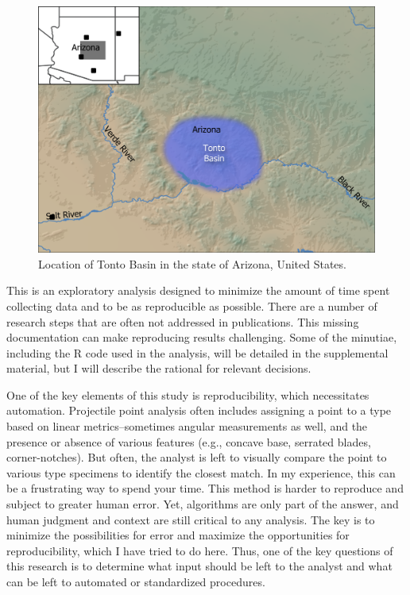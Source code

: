 \documentclass{article}
\begin{document}
\begin{figure}
\includegraphics[width=1\linewidth]{figures/Tonto Basin} \caption{Location of Tonto Basin in the state of Arizona, United States.}\label{fig:TontoBasinMap}
\end{figure}

This is an exploratory analysis designed to minimize the amount of time
spent collecting data and to be as reproducible as possible. There are a
number of research steps that are often not addressed in publications.
This missing documentation can make reproducing results challenging.
Some of the minutiae, including the R code used in the analysis, will be
detailed in the supplemental material, but I will describe the rational
for relevant decisions.

One of the key elements of this study is reproducibility, which
necessitates automation. Projectile point analysis often includes
assigning a point to a type based on linear metrics--sometimes angular
measurements as well, and the presence or absence of various features
(e.g., concave base, serrated blades, corner-notches). But often, the
analyst is left to visually compare the point to various type specimens
to identify the closest match. In my experience, this can be a
frustrating way to spend your time. This method is harder to reproduce
and subject to greater human error. Yet, algorithms are only part of the
answer, and human judgment and context are still critical to any
analysis. The key is to minimize the possibilities for error and
maximize the opportunities for reproducibility, which I have tried to do
here. Thus, one of the key questions of this research is to determine
what input should be left to the analyst and what can be left to
automated or standardized procedures.
\end{document}
